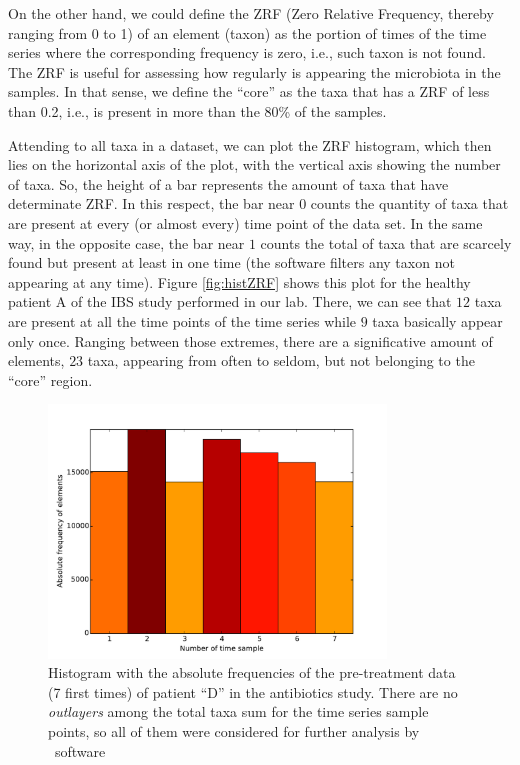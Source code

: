 On the other hand, we could define the ZRF (Zero Relative Frequency, thereby ranging from 0 to 1) of an element (taxon) as the portion of times of the time series where the corresponding frequency is zero, i.e., such taxon is not found. The ZRF is useful for assessing how regularly is appearing the microbiota in the samples. In that sense, we define the ``core'' as the taxa that has a ZRF of less than 0.2, i.e., is present in more than the 80\% of the samples.

Attending to all taxa in a dataset, we can plot the ZRF histogram, which then lies on the horizontal axis of the plot, with the vertical axis showing the number of taxa. So, the height of a bar represents the amount of taxa that have determinate ZRF. In this respect, the bar near $0$ counts the quantity of taxa that are present at every (or almost every) time point of the data set. In the same way, in the opposite case, the bar near $1$ counts the total of taxa that are scarcely found but present at least in one time (the software filters any taxon not appearing at any time). Figure \ref{fig:histZRF} shows this plot for the healthy patient A of the IBS study performed in our lab\cite{IBS}. There, we can see that $12$ taxa are present at all the time points of the time series while $9$ taxa basically appear only once. Ranging between those extremes, there are a significative amount of elements, $23$ taxa, appearing from often to seldom, but not belonging to the ``core'' region.
	
\begin{figure}		
	\centering		
 	\includegraphics[width=0.8\textwidth]{results/hist/antibiotics_h_patD_pre_AbsFreqPlot}		
 	\caption{Histogram with the absolute frequencies of the pre-treatment data (7 first times) of patient ``D'' in the antibiotics study\cite{antibiotic}. There are no \emph{outlayers} among the total taxa sum for the time series sample points, so all of them were considered for further analysis by \CC\ software}		
 	\label{fig:histAFP}		
\end{figure}


